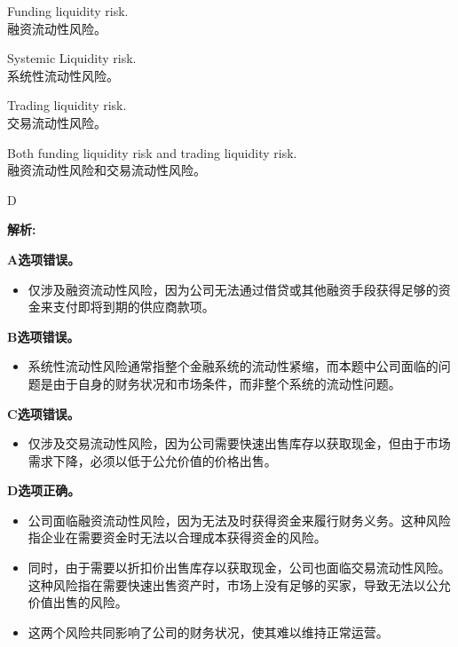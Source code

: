 \documentclass{article}
\newenvironment{explanation}
{\textbf{解析:}\par}
{\par}
\begin{document}
    \begin{choices}
        \item Funding liquidity risk. \\
        融资流动性风险。
        \item Systemic Liquidity risk. \\
        系统性流动性风险。
        \item Trading liquidity risk. \\
        交易流动性风险。
        \item Both funding liquidity risk and trading liquidity risk.\\
        融资流动性风险和交易流动性风险。
    \end{choices}
    
    \begin{correctanswer}
        D
    \end{correctanswer}


    \begin{explanation}
        \textbf{A选项错误。}
        \begin{itemize}
            \item 仅涉及融资流动性风险，因为公司无法通过借贷或其他融资手段获得足够的资金来支付即将到期的供应商款项。
        \end{itemize}
    
        \textbf{B选项错误。}
        \begin{itemize}
            \item 系统性流动性风险通常指整个金融系统的流动性紧缩，而本题中公司面临的问题是由于自身的财务状况和市场条件，而非整个系统的流动性问题。
        \end{itemize}
    
        \textbf{C选项错误。}
        \begin{itemize}
            \item 仅涉及交易流动性风险，因为公司需要快速出售库存以获取现金，但由于市场需求下降，必须以低于公允价值的价格出售。
        \end{itemize}
    
        \textbf{D选项正确。}
        \begin{itemize}
            \item 公司面临融资流动性风险，因为无法及时获得资金来履行财务义务。这种风险指企业在需要资金时无法以合理成本获得资金的风险。
            \item 同时，由于需要以折扣价出售库存以获取现金，公司也面临交易流动性风险。这种风险指在需要快速出售资产时，市场上没有足够的买家，导致无法以公允价值出售的风险。
            \item 这两个风险共同影响了公司的财务状况，使其难以维持正常运营。
        \end{itemize}
    \end{explanation}
\end{document}
